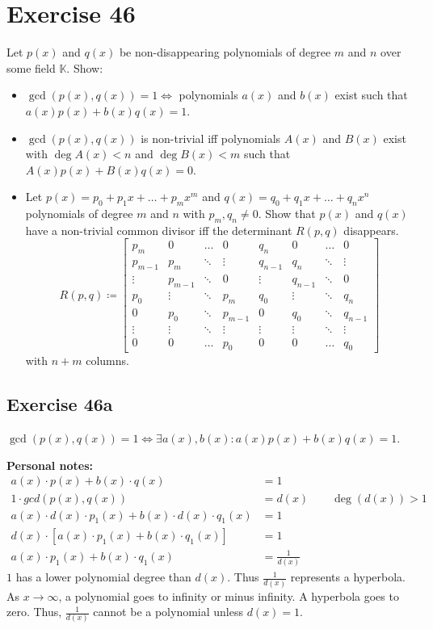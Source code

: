 \documentclass[a4paper]{article}
\theoremstyle{definition}
\begin{document}
\section*{Exercise 46}
\begin{ex}
  Let $p(x)$ and $q(x)$ be non-disappearing polynomials of degree $m$ and $n$ over some field $\mathbb K$. Show:
  \begin{itemize}
    \item $\operatorname{gcd}(p(x), q(x)) = 1 \iff$ polynomials $a(x)$ and $b(x)$ exist such that $a(x) p(x) + b(x) q(x) = 1$.
    \item $\operatorname{gcd}(p(x), q(x))$ is non-trivial iff polynomials $A(x)$ and $B(x)$ exist with $\deg{A(x)} < n$ and $\deg{B(x)} < m$ such that $A(x) p(x) + B(x) q(x) = 0$.
    \item Let $p(x) = p_0 + p_1 x + \dots + p_m x^m$ and $q(x) = q_0 + q_1 x + \dots + q_n x^n$ polynomials of degree $m$ and $n$ with $p_m, q_n \neq 0$.
      Show that $p(x)$ and $q(x)$ have a non-trivial common divisor iff the determinant $R(p, q)$ disappears.
      \[
        R(p, q) \coloneqq \begin{bmatrix}
          p_m & 0 & \dots & 0 & q_n & 0 & \dots & 0 \\
          p_{m-1} & p_m & \ddots & \vdots & q_{n-1} & q_n & \ddots & \vdots \\
          \vdots & p_{m-1} & \ddots & 0 & \vdots & q_{n-1} & \ddots & 0 \\
          p_0 & \vdots & \ddots & p_m & q_0 & \vdots & \ddots & q_n \\
          0 & p_0 & \ddots & p_{m-1} & 0 & q_0 & \ddots & q_{n-1} \\
          \vdots & \vdots & \ddots & \vdots & \vdots & \vdots & \ddots & \vdots \\
          0 & 0 & \dots & p_0 & 0 & 0 & \dots & q_0
        \end{bmatrix}
      \]
      with $n + m$ columns.
  \end{itemize}
\end{ex}

\subsection{Exercise 46a}
$\operatorname{gcd}(p(x), q(x)) = 1 \iff \exists a(x), b(x): a(x) p(x) + b(x) q(x) = 1$.

\textbf{Personal notes:}
\begin{align*}
  a(x) \cdot p(x) + b(x) \cdot q(x) &= 1 \\
  1 \cdot gcd(p(x), q(x)) &= d(x) \qquad \deg(d(x)) > 1 \\
  a(x) \cdot d(x) \cdot p_1(x) + b(x) \cdot d(x) \cdot q_1(x) &= 1 \\
  d(x) \cdot \left[a(x) \cdot p_1(x) + b(x) \cdot q_1(x)\right] &= 1 \\
  a(x) \cdot p_1(x) + b(x) \cdot q_1(x) &= \frac1{d(x)}
\end{align*}
$1$ has a lower polynomial degree than $d(x)$. Thus $\frac1{d(x)}$ represents a hyperbola.
As $x \to \infty$, a polynomial goes to infinity or minus infinity. A hyperbola goes to zero.
Thus, $\frac1{d(x)}$ cannot be a polynomial unless $d(x) = 1$.
\end{document}
